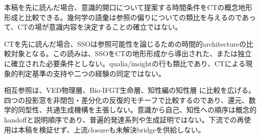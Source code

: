 本稿を先に読んだ場合、意識的開口について提案する時間条件をCTの概念地形形成と比較できる。幾何学の語彙は参照の偏りについての類比を与えるのであって、CTの場が意識内容を決定することの確立ではない。

CTを先に読んだ場合、SSOは参照可能性を論じるための時間的architectureの比較対象となる。この読みは、SSOをCTの地形形成から導出された、または独立に確立された必要条件としない。qualia/insightの行も類比であり、CTによる現象的判定基準の支持や二つの経験の同定ではない。

相互参照は、VED物理層、Bio-IFGT生命層、知性編の知性層 \cite{Intelligence} に比較を広げる。四つの投影窓を非閉包・差分化の反復的モチーフで比較するのであり、還元、数学的同型性、共通生成機構を主張しない。意識から自己、知性への順序は概念的handoffと説明順序であり、普遍的発達系列や生成証明ではない。下流での再使用は本稿を検証せず、上流closureも未解決bridgeを供給しない。
